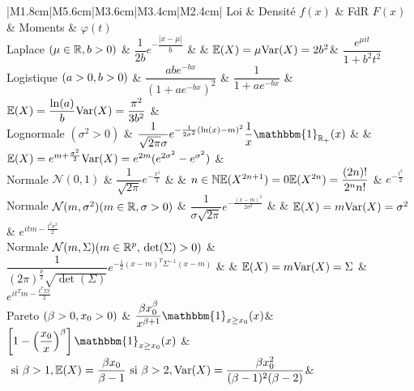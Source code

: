 \documentclass[a4paper, 11pt]{article}
\begin{document}
\newpage

\begin{tabular}{|M{1.8cm}|M{5.6cm}|M{3.6cm}|M{3.4cm}|M{2.4cm}|}
\hline
Loi & Densité $f(x)$ & FdR $F(x)$ & Moments & $\varphi(t)$ \\
\hline 
\hline 
Laplace $(\mu \in \mathbb{R}, \newline b >0)$ & $\dfrac{1}{2b}e^{-\dfrac{|x- \mu|}{b}}$ &  & $\mathbb{E}(X)=\mu \newline \text{Var}(X)= 2b^2$& $\dfrac{e^{\mu i t}}{1+b^2t^2}$ \\
\hline
Logistique $(a>0, \newline b>0)$ & $\dfrac{abe^{-bx}}{(1+ae^{-bx})^2}$ & $\dfrac{1}{1+ae^{-bx}}$ & $\mathbb{E}(X)=\dfrac{\ln(a)}{b} \newline \text{Var}(X)=\dfrac{\pi^2}{3b^2}$ & \\
\hline
Lognormale $(\sigma^2>0)$ & $\dfrac{1}{\sqrt{2\pi}\sigma} e^{-\frac{1}{2 \sigma^2}(\ln(x)-m)^2} \dfrac{1}{x} \mathbbm{1}_{\mathbb{R}_+}(x)$ & & $\mathbb{E}(X)=e^{m+\frac{\sigma^2}{2}} \newline \text{Var}(X)=e^{2m}(e^{2\sigma^2}-e^{\sigma^2})$ & \\
\hline
Normale $\mathcal{N}(0,1)$ & $\dfrac{1}{\sqrt{2\pi}}e^{-\frac{x^2}{2}}$ & & $ n\in \mathbb{N} \newline \mathbb{E}(X^{2n+1}) = 0 \newline \mathbb{E}(X^{2n})=\dfrac{(2n)!}{2^nn!}$ & $e^{-\frac{t^2}{2}}$ \\
\hline
Normale $\mathcal{N}(m,\sigma^2) \newline (m \in \mathbb{R}, \newline \sigma>0)$ & $\dfrac{1}{\sigma \sqrt{2\pi}}e^{-\frac{(x-m)^2}{2 \sigma^2}}$ & & $\mathbb{E}(X) = m \newline \text{Var}(X)=\sigma^2 $ & $e^{itm-\frac{t^2 \sigma^2}{2}}$ \\
\hline
Normale $\mathcal{N}(m,\Sigma) \newline (m \in \mathbb{R}^p, \newline \det(\Sigma)>0)$ & $\dfrac{1}{(2\pi)^{\frac{p}{2}} \sqrt{\det(\Sigma)}}e^{- \frac{1}{2}(x-m)^T \Sigma^{-1} (x-m)}$ & & $\mathbb{E}(X) = m \newline \text{Var}(X)=\Sigma $ & $e^{it^Tm-\frac{t^T \Sigma t}{2}}$ \\
\hline
Pareto $\newline (\beta>0, \newline x_0>0)$ & $\dfrac{\beta x_0^{\beta}}{x^{\beta+1}} \mathbbm{1}_{x \geq x_0}(x)$& $ \left[ 1- \left( \dfrac{x_0}{x}\right)^{\beta} \right] \mathbbm{1}_{x \geq x_0}(x)$ & $ \text{ si } \beta > 1, \mathbb{E}(X)=\dfrac{\beta x_0}{\beta-1}  \newline \text{ si } \beta >2, \text{Var}(X) = \dfrac{ \beta x_0^2}{(\beta-1)^2(\beta-2)} $& \\

\end{tabular}
\end{document}
